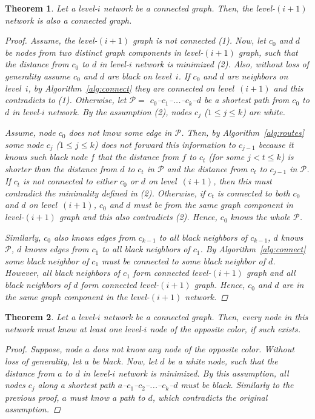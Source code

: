 \documentclass[conference]{IEEEtran}
\newtheorem{thm}{Theorem}
\theoremstyle{definition}
\newcommand{\cP}{{\mathcal{P}}}
\begin{document}
\begin{thm}
    Let a level-$i$ network be a connected graph. Then, the level-$(i+1)$ network is also a connected graph.

    \begin{proof}
        Assume, the level-$(i+1)$ graph is not connected (1). Now, let $c_0$ and $d$ be nodes from two distinct graph components in level-$(i+1)$ graph, such that the distance from $c_0$ to $d$ in level-$i$ network is minimized (2). Also, without loss of generality assume $c_0$ and $d$ are black on level~$i$. If $c_0$ and $d$ are neighbors on level~$i$, by Algorithm~\ref{alg:connect} they are connected on level~$(i+1)$ and this contradicts to (1). Otherwise, let $\cP = $ $c_0$--$c_1$--...--$c_k$--$d$ be a shortest path from $c_0$ to $d$ in level-$i$ network. By the assumption (2), nodes $c_j$ ($1 \le j \le k$) are white.

        Assume, node $c_0$ does not know some edge in $\cP$. Then, by Algorithm~\ref{alg:routes} some node $c_j$ ($1 \le j \le k$) does not forward this information to $c_{j-1}$ because it knows such black node $f$ that the distance from $f$ to $c_t$ (for some $j < t \le k$) is shorter than the distance from $d$ to $c_t$ in $\cP$ and the distance from $c_t$ to $c_{j-1}$ in $\cP$. If $c_t$ is not connected to either $c_0$ or $d$ on level~$(i+1)$, then this must contradict the minimality defined in (2). Otherwise, if $c_t$ is connected to both $c_0$ and $d$ on level~$(i+1)$, $c_0$ and $d$ must be from the same graph component in level-$(i+1)$ graph and this also contradicts (2). Hence, $c_0$ knows the whole $\cP$. 
        
        Similarly, $c_0$ also knows edges from $c_{k-1}$ to all black neighbors of $c_{k-1}$, $d$ knows $\cP$, $d$ knows edges from $c_1$ to all black neighbors of $c_1$. By Algorithm~\ref{alg:connect} some black neighbor of $c_1$ must be connected to some black neighbor of $d$. However, all black neighbors of $c_1$ form connected level-$(i+1)$ graph and all black neighbors of $d$ form connected level-$(i+1)$ graph. Hence, $c_0$ and $d$ are in the same graph component in the level-$(i+1)$ network.
    \end{proof}

    \label{thm:connectivity-levels}
\end{thm}

\begin{thm}
    Let a level-$i$ network be a connected graph. Then, every node in this network must know at least one level-$i$ node of the opposite color, if such exists.

    \begin{proof}
        Suppose, node $a$ does not know any node of the opposite color. Without loss of generality, let $a$ be black. Now, let $d$ be a white node, such that the distance from $a$ to $d$ in level-$i$ network is minimized. By this assumption, all nodes $c_j$ along a shortest path $a$--$c_1$--$c_2$--...--$c_k$--$d$ must be black. Similarly to the previous proof, $a$ must know a path to $d$, which contradicts the original assumption.
    \end{proof}

    \label{thm:connectivity-colors}
\end{thm}
\end{document}
